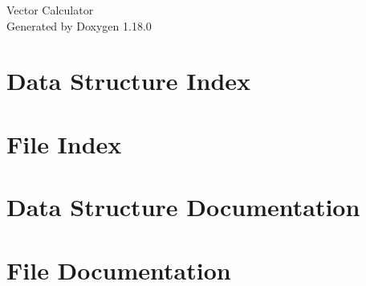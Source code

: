 \documentclass[twoside]{book}
\newcommand{\+}{\discretionary{\mbox{\scriptsize$\hookleftarrow$}}{}{}}
\newcommand{\clearemptydoublepage}{%
    \newpage{\pagestyle{empty}\cleardoublepage}%
  }
\begin{document}
  \raggedbottom
    \hypersetup{pageanchor=false,
                bookmarksnumbered=true,
                pdfencoding=unicode
               }
  \begin{titlepage}
  \vspace*{7cm}
  \begin{center}%
  {\Large Vector Calculator}\\
  \vspace*{1cm}
  {\large Generated by Doxygen 1.18.0}\\
  \end{center}
  \end{titlepage}
  \clearemptydoublepage
  \tableofcontents
  \clearemptydoublepage
  \hypersetup{pageanchor=true}
\chapter{Data Structure Index}

\chapter{File Index}

\chapter{Data Structure Documentation}

\chapter{File Documentation}



  \backmatter
  \newpage
  \clearemptydoublepage
  \printindex
\end{document}
